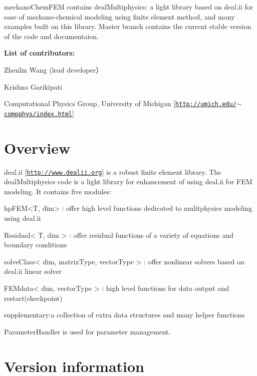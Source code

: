 mechano\+Chem\+F\+EM contains deal\+Multiphysics\+: a light library based on deal.\+ii for ease of mechano-\/chemical modeling using finite element method, and many examples built on this library. Master branch contains the current stable version of the code and documentaion.

{\bfseries List of contributors\+:}~\newline


Zhenlin Wang (lead developer）~\newline


Krishna Garikipati~\newline


Computational Physics Group, University of Michigan \mbox{[}\href{http://umich.edu/~compphys/index.html}{\tt http\+://umich.\+edu/$\sim$compphys/index.\+html}\mbox{]}

\section*{{\bfseries Overview}~\newline
 }

deal.\+ii \mbox{[}\href{http://www.dealii.org}{\tt http\+://www.\+dealii.\+org}\mbox{]} is a robust finite element library. The deal\+Multiphysics code is a light library for enhancement of using deal.\+ii for F\+EM modeling. It contains five modules\+:


\begin{DoxyCode}
hpFEM<T, dim> : offer high level functions dedicated to mulitphysics modeling \textcolor{keyword}{using} deal.ii

Residual< T, dim > : offer residual functions of a variety of equations and boundary conditions

solveClass< dim, matrixType, vectorType > : offer nonlinear solvers based on deal.ii linear solver

FEMdata< dim, vectorType > : high level functions \textcolor{keywordflow}{for} data output and restart(checkpoint)

supplementary:a collection of extra data structures and many helper functions
\end{DoxyCode}


Parameter\+Handler is used for parameter management.

\section*{{\bfseries Version information}~\newline
 }

